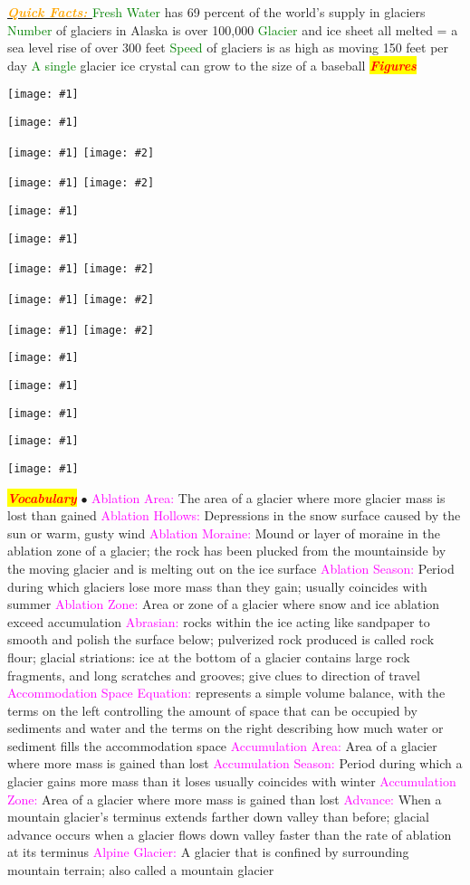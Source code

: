 \documentclass{article}
\newcommand{\ddd}{$\bullet$}
\newcommand{\red}[1]{\textcolor{red}{#1}}
\newcommand{\green}[1]{\textcolor{green}{#1}}
\newcommand{\pink}[1]{\textcolor{magenta}{#1}}
\newcommand{\orange}[1]{\textcolor{orange}{#1}}
\newcommand{\mysection}[1]{\colorbox{yellow}{{\textbf{\textbf{\textit{\red{#1}}}}}}}
\newcommand{\mysub}[1]{\underline{\textbf{{\textit{\orange{#1}}}}}}
\newcommand{\mysubsub}[1]{{{\green{#1}}}}
\newcommand{\vocab}[1]{{\pink{#1}}}
\newcommand{\fig}[1]{
	\texttt{[image: \#1]}
}
\newcommand{\figtwo}[2]{
	\texttt{[image: \#1]}
	\texttt{[image: \#2]}
}
\begin{document}
\begin{multicols*}{4}
		    \mysub{Quick Facts: }
		    \mysubsub{Fresh Water} has 69 percent of the world's supply in glaciers
		    \mysubsub{Number} of glaciers in Alaska is over 100,000
		    \mysubsub{Glacier} and ice sheet all melted = a sea level rise of over 300 feet
		    \mysubsub{Speed} of glaciers is as high as moving 150 feet per day
		    \mysubsub{A single} glacier ice crystal can grow to the size of a baseball
	\mysection{Figures}
	\fig{iceshelf_locations}
	\fig{othersea}
	\figtwo{arctic}{lgm}
	\figtwo{corrie}{milan}
	\fig{seaice}
	\fig{na}
	\figtwo{southern}{greenland}
	\figtwo{fjord}{glacier}
	\figtwo{lauren}{cordi}
	\fig{wordlmap}
	\fig{filler}

	\fig{alpine}
	\fig{varve}
	\fig{volume}
	
	\pagebreak
	\mysection{Vocabulary} 
		\ddd
		\vocab{        Ablation Area: } The area of a glacier where more glacier mass is lost than gained 
		\vocab{        Ablation Hollows: } Depressions in the snow surface caused by the sun or warm, gusty wind 
		\vocab{        Ablation Moraine: } Mound or layer of moraine in the ablation zone of a glacier; the rock has been plucked from the mountainside by the moving glacier and is melting out on the ice surface 
		\vocab{        Ablation Season: } Period during which glaciers lose more mass than they gain; usually coincides with summer 
		\vocab{        Ablation Zone: } Area or zone of a glacier where snow and ice ablation exceed accumulation 
		\vocab{Abrasian: } rocks within the ice acting like sandpaper to smooth and polish the surface below; pulverized rock produced is called rock flour; glacial striations: ice at the bottom of a glacier contains large rock fragments, and long scratches and grooves; give clues to direction of travel  
		\vocab{Accommodation Space Equation:} represents a simple volume balance, with the terms on the left controlling the amount of space that can be occupied by sediments and water and the terms on the right describing how much water or sediment fills the accommodation space  
		\vocab{        Accumulation Area: } Area of a glacier where more mass is gained than lost 
		\vocab{        Accumulation Season: } Period during which a glacier gains more mass than it loses usually coincides with winter 
		\vocab{        Accumulation Zone: } Area of a glacier where more mass is gained than lost 
		\vocab{        Advance: } When a mountain glacier’s terminus extends farther down valley than before; glacial advance occurs when a glacier flows down valley faster than the rate of ablation at its terminus 
		\vocab{        Alpine Glacier: } A glacier that is confined by surrounding mountain terrain; also called a mountain glacier  

\end{multicols*}
\end{document}
